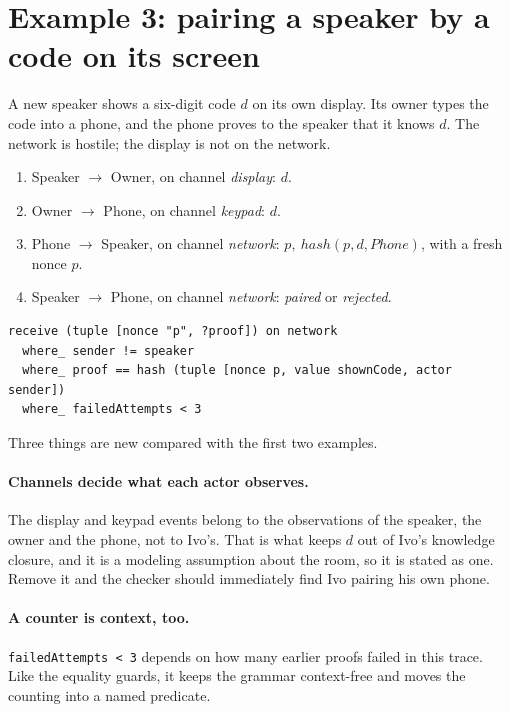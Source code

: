 \section{Example 3: pairing a speaker by a code on its screen}

A new speaker shows a six-digit code $d$ on its own display. Its owner types
the code into a phone, and the phone proves to the speaker that it knows $d$.
The network is hostile; the display is not on the network.

\begin{enumerate}
  \item Speaker $\to$ Owner, on channel \emph{display}: $d$.
  \item Owner $\to$ Phone, on channel \emph{keypad}: $d$.
  \item Phone $\to$ Speaker, on channel \emph{network}: $p,\ \mathit{hash}(p, d, \mathit{Phone})$, with a fresh nonce $p$.
  \item Speaker $\to$ Phone, on channel \emph{network}: \emph{paired} or \emph{rejected}.
\end{enumerate}

\begin{lstlisting}
receive (tuple [nonce "p", ?proof]) on network
  where_ sender != speaker
  where_ proof == hash (tuple [nonce p, value shownCode, actor sender])
  where_ failedAttempts < 3
\end{lstlisting}

Three things are new compared with the first two examples.

\paragraph{Channels decide what each actor observes.} The display and keypad
events belong to the observations of the speaker, the owner and the phone, not
to Ivo's. That is what keeps $d$ out of Ivo's knowledge closure, and it is a
modeling assumption about the room, so it is stated as one. Remove it and the
checker should immediately find Ivo pairing his own phone.

\paragraph{A counter is context, too.} \texttt{failedAttempts < 3} depends on
how many earlier proofs failed in this trace. Like the equality guards, it
keeps the grammar context-free and moves the counting into a named predicate.

